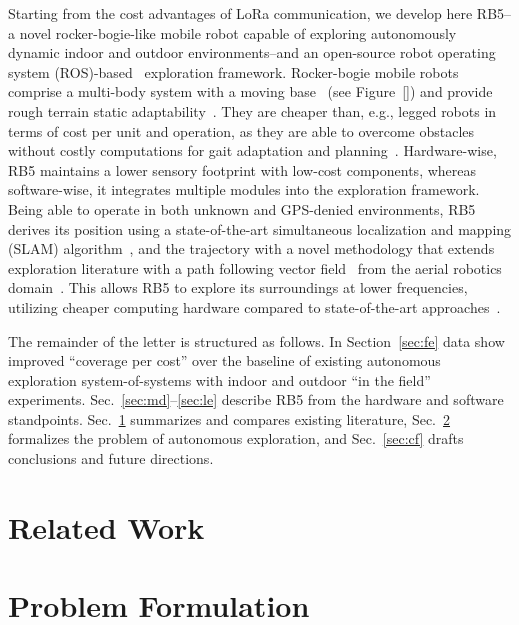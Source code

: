 \documentclass[lettersize,journal]{IEEEtran}
\begin{document}
Starting from the cost advantages of LoRa communication, we develop here RB5--a novel rocker-bogie-like mobile robot capable of exploring autonomously dynamic indoor and outdoor environments--and an open-source robot operating system (ROS)-based~\cite{quigley2009ros} exploration framework.
Rocker-bogie mobile robots comprise a multi-body system with a moving base~\cite{setterfield2013terrain,mann2005dynamic,faisal2021low} (see Figure~\ref{}) and provide rough terrain static adaptability~\cite{kim2012optimal}. They are cheaper than, e.g., legged robots in terms of cost per unit and operation, as they are able to overcome obstacles without costly computations for gait adaptation and planning~\cite{muller2021openbot}.
Hardware-wise, RB5 maintains a lower sensory footprint with low-cost components, whereas 
software-wise, it integrates multiple modules into the exploration framework. Being able to operate in both unknown and GPS-denied environments, RB5 derives its position using a state-of-the-art simultaneous localization and mapping (SLAM) algorithm~\cite{labbe2019rtab,campos2021orb}, and the trajectory with a novel methodology that extends exploration literature with a path following vector field~\cite{goncalves2010vector} from the aerial robotics domain~\cite{seewald2022energy,garcia201guidance,seewaldphdthesis}. This allows RB5 to explore its surroundings at lower frequencies, utilizing cheaper computing hardware compared to state-of-the-art approaches~\cite{placed2022survey,tabib2022autonomous,ebadi2020lamp,dang2019graph}. 

The remainder of the letter is structured as follows. In Section~\ref{sec:fe} data show improved ``coverage per cost'' over the baseline of existing autonomous exploration system-of-systems with indoor and outdoor ``in the field'' experiments. 
Sec.~\ref{sec:md}--\ref{sec:le} describe RB5 from the hardware and software standpoints. Sec.~\ref{sec:rw} summarizes and compares existing literature, Sec.~\ref{sec:pf} formalizes the problem of autonomous exploration, and Sec.~\ref{sec:cf} drafts conclusions %
and future directions.


\section{Related Work}
\label{sec:rw}

\section{Problem Formulation}
\label{sec:pf}
\end{document}
